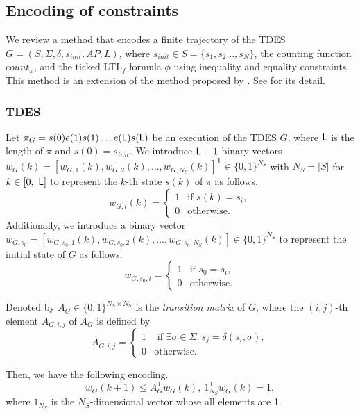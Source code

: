 \documentclass[journal,twoside,web]{IEEEtran}
\newcommand{\Len}{{\sf L}}
\begin{document}

\subsection{Encoding of constraints}\label{encode}
%
We review a method that encodes a finite trajectory of the TDES $G=(S, \Sigma, \delta, s_{init}, AP, L)$, where $s_{init} \in S= \{s_1, s_2 \ldots, s_{N} \}$, the counting function $count_\pi$, and the ticked LTL$_f$ formula $\phi$ using inequality and equality constraints.
This method is an extension of the method proposed by \cite{BHJLS2006}.  See \cite{KHU2020} for its detail.
%
\subsubsection{TDES}
Let $\pi_{G}=s(0)e(1)s(1) \ldots e(\Len)s(\Len)$ be an execution of the TDES $G$, where $\Len$ is the length of $\pi$ and $s(0)=s_{init}$.
We introduce $\Len+1$ binary vectors $w_G (k)=[w_{G,1} (k), w_{G,2} (k) , \ldots , w_{G,N_S} (k) ]^{\mathsf{T}} \in \{0, 1\}^{N_S}$ with $N_S=|S|$ for $k\in [0,\ \Len]$ to represent the $k$-th state $s(k)$ of $\pi$ as follows.
\[
w_{G,i}(k)=\left\{ \begin{array}{ll}
1 & \mbox{if } s(k)=s_i, \\
0 & \mbox{otherwise.}
\end{array} \right.
\]
Additionally, we introduce a binary vector $w_{G,s_0}=[w_{G,s_0,1} (k), w_{G,s_0,2} (k) , \ldots , w_{G,s_0,N_S} (k) ]\in \{0, 1\}^{N_S}$ to represent the initial state of $G$ as follows.
\[
w_{G,s_0,i}=\left\{ \begin{array}{ll}
1 & \mbox{if } s_0=s_i, \\
0 & \mbox{otherwise.}
\end{array} \right.
\]

Denoted by $A_G \in \{0, 1\}^{N_S \times N_S}$ is the \textit{transition matrix} of  $G$, where the $(i,j)$-th element $A_{G,i,j}$ of $A_G$ is defined by
\[
A_{G,i,j}=\left\{ \begin{array}{ll}
1 & \mbox{ if } \exists \sigma \in \Sigma.\ s_j=\delta(s_i, \sigma), \\
0 & \mbox{otherwise.}
\end{array} \right.
\]
 

Then, we have the following encoding.
\begin{equation}\label{w}
w_G(k+1) \leq A_{G}^{\mathsf{T}} w_G(k), \ {1}^\mathsf{T} _{N_S} w_G(k) =1, 
\end{equation}
where ${1}_{N_S}$ is the $N_S$-dimensional vector whose all elements are 1.
%
%
\end{document}
